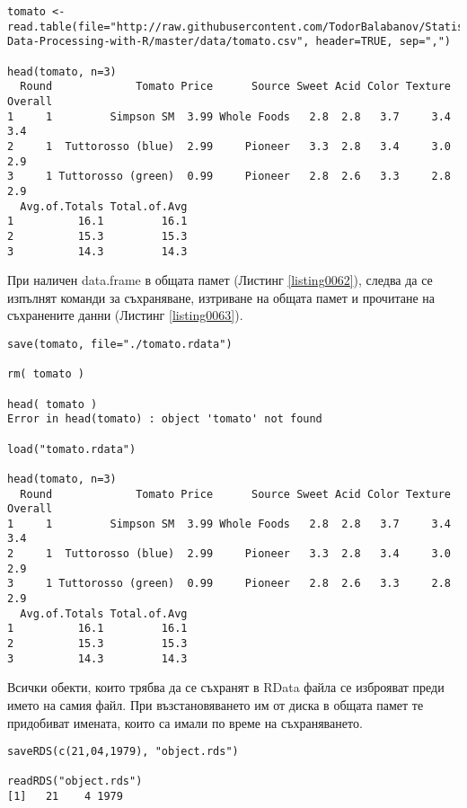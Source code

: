 \begin{lstlisting}[caption=Използване на множество от данни, label=listing0062]
tomato <- read.table(file="http://raw.githubusercontent.com/TodorBalabanov/Statistical-Data-Processing-with-R/master/data/tomato.csv", header=TRUE, sep=",")

head(tomato, n=3)
  Round             Tomato Price      Source Sweet Acid Color Texture Overall
1     1         Simpson SM  3.99 Whole Foods   2.8  2.8   3.7     3.4     3.4
2     1  Tuttorosso (blue)  2.99     Pioneer   3.3  2.8   3.4     3.0     2.9
3     1 Tuttorosso (green)  0.99     Pioneer   2.8  2.6   3.3     2.8     2.9
  Avg.of.Totals Total.of.Avg
1          16.1         16.1
2          15.3         15.3
3          14.3         14.3
\end{lstlisting}

При наличен data.frame в общата памет (Листинг \ref{listing0062}), следва да се изпълнят команди за съхраняване, изтриване на общата памет и прочитане на съхранените данни (Листинг \ref{listing0063}).

\begin{lstlisting}[caption=Запис и четене в RData файл, label=listing0063]
save(tomato, file="./tomato.rdata")

rm( tomato )

head( tomato )
Error in head(tomato) : object 'tomato' not found

load("tomato.rdata")

head(tomato, n=3)
  Round             Tomato Price      Source Sweet Acid Color Texture Overall
1     1         Simpson SM  3.99 Whole Foods   2.8  2.8   3.7     3.4     3.4
2     1  Tuttorosso (blue)  2.99     Pioneer   3.3  2.8   3.4     3.0     2.9
3     1 Tuttorosso (green)  0.99     Pioneer   2.8  2.6   3.3     2.8     2.9
  Avg.of.Totals Total.of.Avg
1          16.1         16.1
2          15.3         15.3
3          14.3         14.3
\end{lstlisting}

Всички обекти, които трябва да се съхранят в RData файла се изброяват преди името на самия файл. При възстановяването им от диска в общата памет те придобиват имената, които са имали по време на съхраняването.

\begin{lstlisting}[caption=Запис и четене на един обект, label=listing0064]
saveRDS(c(21,04,1979), "object.rds")

readRDS("object.rds")
[1]   21    4 1979
\end{lstlisting}

